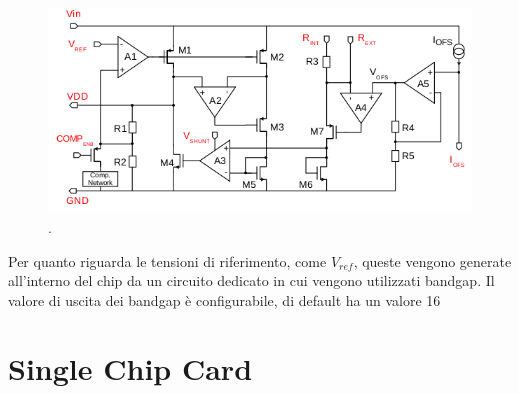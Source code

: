 \begin{figure}
\centering
\includegraphics[scale=.6]{Immagini/SLDO_RD53A}
\caption{.}
\label{SLDO_RD53A}
\end{figure}

Per quanto riguarda le tensioni di riferimento, come $V_{ref}$, queste vengono generate all'interno del chip da un circuito dedicato in cui vengono utilizzati bandgap. Il valore di uscita dei bandgap è configurabile, di default ha un valore 16 

\section{Single Chip Card}


